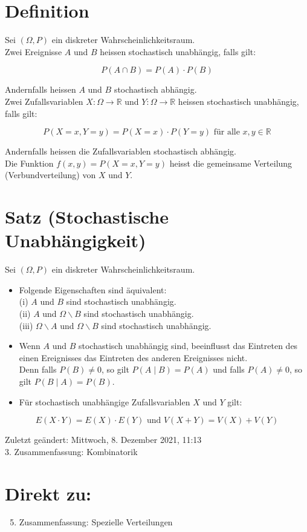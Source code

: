 \documentclass[10pt]{article}
\begin{document}
\section*{Definition}
Sei $(\Omega, P)$ ein diskreter Wahrscheinlichkeitsraum.\\
Zwei Ereignisse $A$ und $B$ heissen stochastisch unabhängig, falls gilt:

$$
P(A \cap B)=P(A) \cdot P(B)
$$

Andernfalls heissen $A$ und $B$ stochastisch abhängig.\\
Zwei Zufallsvariablen $X: \Omega \rightarrow \mathbb{R}$ und $Y: \Omega \rightarrow \mathbb{R}$ heissen stochastisch unabhängig, falls gilt:

$$
P(X=x, Y=y)=P(X=x) \cdot P(Y=y) \text { für alle } x, y \in \mathbb{R}
$$

Andernfalls heissen die Zufallsvariablen stochastisch abhängig.\\
Die Funktion $f(x, y)=P(X=x, Y=y)$ heisst die gemeinsame Verteilung (Verbundverteilung) von $X$ und $Y$.

\section*{Satz (Stochastische Unabhängigkeit)}
Sei $(\Omega, P)$ ein diskreter Wahrscheinlichkeitsraum.

\begin{itemize}
  \item Folgende Eigenschaften sind äquivalent:\\
(i) $A$ und $B$ sind stochastisch unabhängig.\\
(ii) $A$ und $\Omega \backslash B$ sind stochastisch unabhängig.\\
(iii) $\Omega \backslash A$ und $\Omega \backslash B$ sind stochastisch unabhängig.
  \item Wenn $A$ und $B$ stochastisch unabhängig sind, beeinflusst das Eintreten des einen Ereignisses das Eintreten des anderen Ereignisses nicht.\\
Denn falls $P(B) \neq 0$, so gilt $P(A \mid B)=P(A)$ und falls $P(A) \neq 0$, so gilt $P(B \mid A)=P(B)$.
  \item Für stochastisch unabhängige Zufallsvariablen $X$ und $Y$ gilt:
\end{itemize}

$$
E(X \cdot Y)=E(X) \cdot E(Y) \text { und } V(X+Y)=V(X)+V(Y)
$$

Zuletzt geändert: Mittwoch, 8. Dezember 2021, 11:13\\
3. Zusammenfassung: Kombinatorik

\section*{Direkt zu:}
\begin{enumerate}
  \setcounter{enumi}{4}
  \item Zusammenfassung: Spezielle Verteilungen
\end{enumerate}
\end{document}
